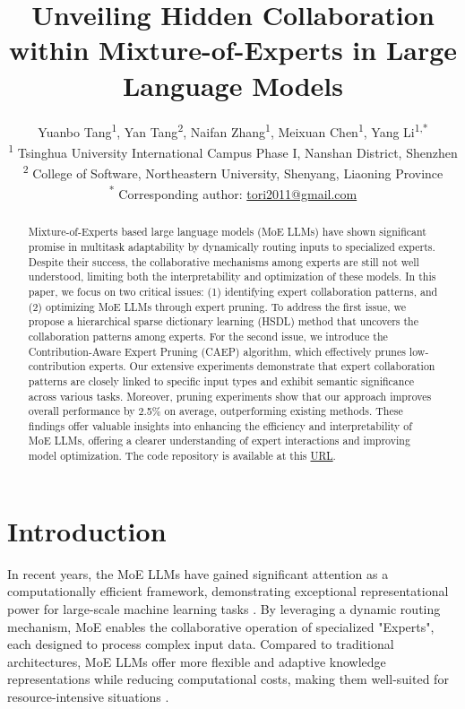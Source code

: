 \documentclass[11pt]{article}
\title{Unveiling Hidden Collaboration  within Mixture-of-Experts in Large Language Models} %
\author{  
  Yuanbo Tang\textsuperscript{1},   
  Yan Tang\textsuperscript{2},  
  Naifan Zhang\textsuperscript{1},  
  Meixuan Chen\textsuperscript{1},   
  Yang Li\textsuperscript{1,*} \\[5pt]  
  \small  
  \textsuperscript{1} Tsinghua University International Campus Phase I, Nanshan District, Shenzhen \\
  \small
  \textsuperscript{2} College of Software, Northeastern University, Shenyang, Liaoning Province \\
  \small
  \textsuperscript{*} Corresponding author: \href{mailto:tori2011@gmail.com}{tori2011@gmail.com}  
}
\begin{document}
\maketitle


\begin{abstract}

Mixture-of-Experts based large language models (MoE LLMs) have shown significant promise in multitask adaptability by dynamically routing inputs to specialized experts. Despite their success, the collaborative mechanisms among experts are still not well understood, limiting both the interpretability and optimization of these models. In this paper, we focus on two critical issues: (1) identifying expert collaboration patterns, and (2) optimizing MoE LLMs through expert pruning. To address the first issue, we propose a hierarchical sparse dictionary learning (HSDL) method that uncovers the collaboration patterns among experts. For the second issue, we introduce the Contribution-Aware Expert Pruning (CAEP) algorithm, which effectively prunes low-contribution experts. Our extensive experiments demonstrate that expert collaboration patterns are closely linked to specific input types and exhibit semantic significance across various tasks. Moreover, pruning experiments show  that our
approach improves overall performance by 2.5\% on average, outperforming existing methods. These findings offer valuable insights into enhancing the efficiency and interpretability of MoE LLMs, offering a clearer understanding of expert interactions and improving model optimization. The code repository is available at this \href{https://anonymous.4open.science/r/Unveiling-Hidden-Collaboration-within-Mixture-of-Experts-in-Large-Language-Models-0A16/}{URL}.


\end{abstract}

\section{Introduction}
In recent years, the MoE LLMs have gained significant attention as a computationally efficient framework, demonstrating exceptional representational power for large-scale machine learning tasks \cite{jiang_mixtral_2024,fedus_switch_2022}. By leveraging a dynamic routing mechanism, MoE enables the collaborative operation of specialized "Experts", each designed to process complex input data. Compared to traditional architectures, MoE LLMs offer more flexible and adaptive knowledge representations while reducing computational costs, making them well-suited for resource-intensive situations \cite{cai_survey_2024}. 
\end{document}
